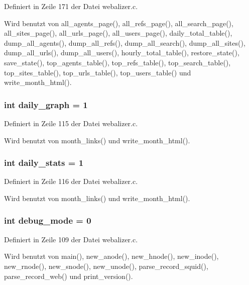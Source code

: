 Definiert in Zeile 171 der Datei webalizer.c.

Wird benutzt von all\_\-agents\_\-page(), all\_\-refs\_\-page(), all\_\-search\_\-page(), all\_\-sites\_\-page(), all\_\-urls\_\-page(), all\_\-users\_\-page(), daily\_\-total\_\-table(), dump\_\-all\_\-agents(), dump\_\-all\_\-refs(), dump\_\-all\_\-search(), dump\_\-all\_\-sites(), dump\_\-all\_\-urls(), dump\_\-all\_\-users(), hourly\_\-total\_\-table(), restore\_\-state(), save\_\-state(), top\_\-agents\_\-table(), top\_\-refs\_\-table(), top\_\-search\_\-table(), top\_\-sites\_\-table(), top\_\-urls\_\-table(), top\_\-users\_\-table() und write\_\-month\_\-html().
\subsubsection{\setlength{\rightskip}{0pt plus 5cm}int {\bf daily\_\-graph} = 1}\label{webalizer_8c_81ebc74fab71c6cde9eff752ad0b5974}




Definiert in Zeile 115 der Datei webalizer.c.

Wird benutzt von month\_\-links() und write\_\-month\_\-html().
\subsubsection{\setlength{\rightskip}{0pt plus 5cm}int {\bf daily\_\-stats} = 1}\label{webalizer_8c_4c83c5bd481ef466be0d92fd9ad6c8b1}




Definiert in Zeile 116 der Datei webalizer.c.

Wird benutzt von month\_\-links() und write\_\-month\_\-html().
\subsubsection{\setlength{\rightskip}{0pt plus 5cm}int {\bf debug\_\-mode} = 0}\label{webalizer_8c_4f7caf3ead45aac3963d1e354e820017}




Definiert in Zeile 109 der Datei webalizer.c.

Wird benutzt von main(), new\_\-anode(), new\_\-hnode(), new\_\-inode(), new\_\-rnode(), new\_\-snode(), new\_\-unode(), parse\_\-record\_\-squid(), parse\_\-record\_\-web() und print\_\-version().
